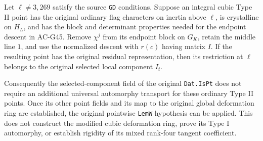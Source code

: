 \begin{corollary}
\label{AC-G48-cubic}
Let $\ell\ne3,269$ satisfy the source \texttt{GD} conditions.
Suppose an integral cubic Type II point has the original
ordinary flag characters on inertia above $\ell$, is
crystalline on $H_L$, and has the block and determinant
properties needed for the endpoint descent in AC-G45.
Remove $\chi^j$ from its endpoint block on $G_K$, retain
the middle line $1$, and use the normalized descent with
$r(c)$ having matrix $I$.
If the resulting point has the original residual
representation, then its restriction at $\ell$ belongs
to the original selected local component $I_t$.

Consequently the selected-component field of the original
\texttt{Dat.IsPt} does not require an additional universal
automorphy transport for these ordinary Type II points.
Once its other point fields and its map to the original
global deformation ring are established, the original
pointwise \texttt{LemW} hypothesis can be applied.
This does not construct the modified cubic deformation ring,
prove its Type I automorphy, or establish rigidity of its
mixed rank-four tangent coefficient.
\end{corollary}
